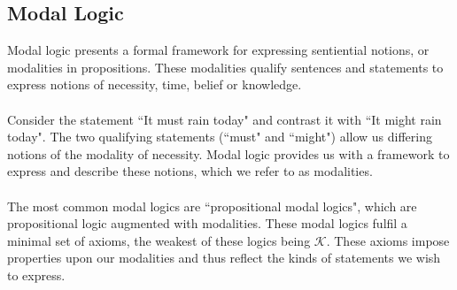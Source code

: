 \documentclass[12pt, a4paper, twoside]{article}
\begin{document}
\subsection{Modal Logic}\label{epistemic_modal}
Modal logic presents a formal framework for expressing sentiential notions, or
modalities in propositions.
These modalities qualify sentences and statements to express notions of
necessity, time, belief or knowledge.\citep{blackburn2002modal}\\
\\
Consider the statement ``It must rain today" and contrast it with ``It
might rain today".
The two qualifying statements (``must" and ``might") allow us differing notions
of the modality of necessity.
Modal logic provides us with a framework to express and describe these
notions, which we refer to as modalities.\\
\\
The most common modal logics are ``propositional modal logics", which are
propositional logic augmented with modalities.
These modal logics fulfil a minimal set of axioms, the weakest of these logics
being $\mathcal{K}$.
These axioms impose properties upon our modalities and thus reflect the kinds of
statements we wish to express.
\end{document}
